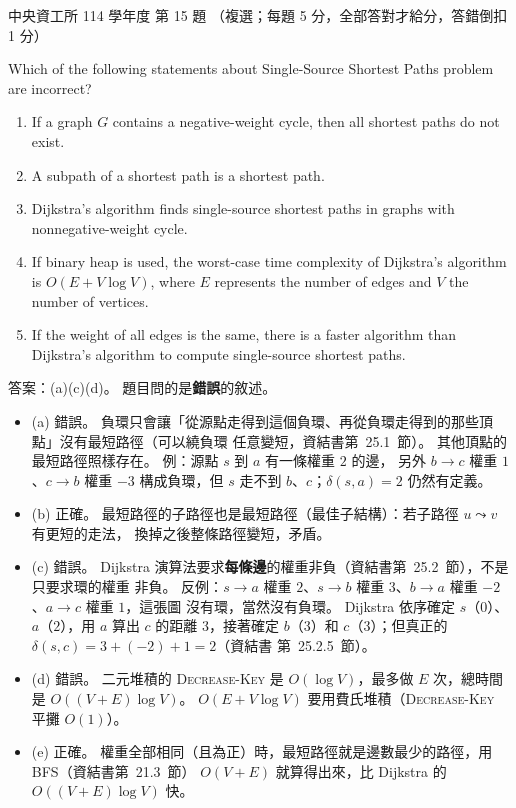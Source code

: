 \begin{pastexam}[label={px:ncu-114-dsa-15}]{中央資工所 114 學年度 第 15 題}
（複選；每題 5 分，全部答對才給分，答錯倒扣 1 分）

Which of the following statements about Single-Source Shortest Paths problem are incorrect?
\begin{enumerate}[label=(\alph*)]
\item If a graph $G$ contains a negative-weight cycle, then all shortest paths do not exist.
\item A subpath of a shortest path is a shortest path.
\item Dijkstra's algorithm finds single-source shortest paths in graphs with nonnegative-weight cycle.
\item If binary heap is used, the worst-case time complexity of Dijkstra's algorithm is
$O(E+V\log V)$, where $E$ represents the number of edges and $V$ the number of vertices.
\item If the weight of all edges is the same, there is a faster algorithm than Dijkstra's algorithm to
compute single-source shortest paths.
\end{enumerate}
\end{pastexam}

\begin{pastsoln}
答案：(a)(c)(d)。 題目問的是\textbf{錯誤}的敘述。

\begin{itemize}
\item (a) 錯誤。 負環只會讓「從源點走得到這個負環、再從負環走得到的那些頂點」沒有最短路徑（可以繞負環
任意變短，資結書第~25.1~節）。 其他頂點的最短路徑照樣存在。 例：源點 $s$ 到 $a$ 有一條權重 $2$ 的邊，
另外 $b \to c$ 權重 $1$、$c \to b$ 權重 $-3$ 構成負環，但 $s$ 走不到 $b$、$c$；$\delta(s, a) = 2$ 仍然有定義。
\item (b) 正確。 最短路徑的子路徑也是最短路徑（最佳子結構）：若子路徑 $u \leadsto v$ 有更短的走法，
換掉之後整條路徑變短，矛盾。
\item (c) 錯誤。 Dijkstra 演算法要求\textbf{每條邊}的權重非負（資結書第~25.2~節），不是只要求環的權重
非負。 反例：$s \to a$ 權重 $2$、$s \to b$ 權重 $3$、$b \to a$ 權重 $-2$、$a \to c$ 權重 $1$，這張圖
沒有環，當然沒有負環。 Dijkstra 依序確定 $s$（$0$）、$a$（$2$），用 $a$ 算出 $c$ 的距離 $3$，接著確定
$b$（$3$）和 $c$（$3$）；但真正的 $\delta(s, c) = 3 + (-2) + 1 = 2$（資結書
第~25.2.5~節）。
\item (d) 錯誤。 二元堆積的 \textsc{Decrease-Key} 是 $O(\log V)$，最多做 $E$ 次，總時間是
$O((V + E) \log V)$。 $O(E + V \log V)$ 要用費氏堆積（\textsc{Decrease-Key} 平攤 $O(1)$）。
\item (e) 正確。 權重全部相同（且為正）時，最短路徑就是邊數最少的路徑，用 BFS（資結書第~21.3~節）
$O(V + E)$ 就算得出來，比 Dijkstra 的 $O((V + E) \log V)$ 快。
\end{itemize}
\end{pastsoln}
